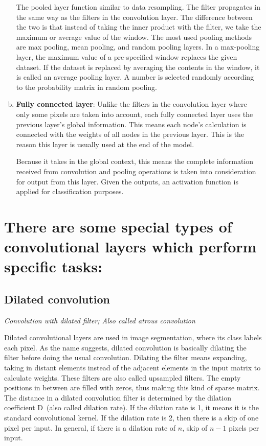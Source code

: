 \begin{enumerate}[(a)]
        The pooled layer function similar to data resampling. The filter propagates in the same way as the filters in the convolution layer. The difference between the two is that instead of taking the inner product with the filter, we take the maximum or average value of the window. The most used pooling methods are max pooling, mean pooling, and random pooling layers. In a max-pooling layer, the maximum value of a pre-specified window replaces the given dataset. If the dataset is replaced by averaging the contents in the window, it is called an average pooling layer. A number is selected randomly according to the probability matrix in random pooling.

    \item \textbf{Fully connected layer}:
        Unlike the filters in the convolution layer where only some pixels are taken into account, each fully connected layer uses the previous layer's global information. This means each node’s calculation is connected with the weights of all nodes in the previous layer. This is the reason this layer is usually used at the end of the model. 

        Because it takes in the global context, this means the complete information received from convolution and pooling operations is taken into consideration for output from this layer. Given the outputs, an activation function is applied for classification purposes.
\end{enumerate}

\section*{There are some special types of convolutional layers which perform specific tasks:}
\subsection{Dilated convolution}
\label{sec:Dilated_Convolution}
\textit{Convolution with dilated filter; Also called atrous convolution}

    Dilated convolutional layers are used in image segmentation, where its class labels each pixel. As the name suggests, dilated convolution is basically dilating the filter before doing the usual convolution. Dilating the filter means expanding, taking in distant elements instead of the adjacent elements in the input matrix to calculate weights. These filters are also called upsampled filters. The empty positions in between are filled with zeros, thus making this kind of sparse matrix. The distance in a dilated convolution filter is determined by the dilation coefficient D~(also called dilation rate). If the dilation rate is 1, it means it is the standard convolutional kernel. If the dilation rate is 2, then there is a skip of one pixel per input. In general, if there is a dilation rate of $n$, skip of $n-1$ pixels per input.
    
